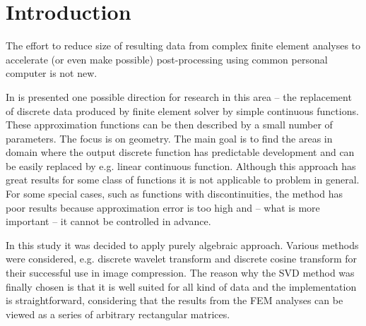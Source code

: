 \section{Introduction}
\label{sec:introduction}


The effort to reduce size of resulting data from complex finite element analyses to accelerate (or even make possible) post-processing using common personal computer is not new.


In \cite{Benes2016} is presented one possible direction for research in this area -- the replacement of discrete data produced by finite element solver by simple continuous functions. These approximation functions can be then described by a small number of parameters. The focus is on geometry. The main goal is to find the areas in domain where the output discrete function has predictable development and can be easily replaced by e.g. linear continuous function. Although this approach has great results for some class of functions it is not applicable to problem in general. For some special cases, such as functions with discontinuities, the method has poor results because approximation error is too high and -- what is more important -- it cannot be controlled in advance.

In this study it was decided to apply purely algebraic approach. Various methods were considered, e.g. discrete wavelet transform \cite{Lui2001} and discrete cosine transform \cite{Watson1994} for their successful use in image compression. The reason why the SVD method was finally chosen is that it is well suited for all kind of data and the implementation is straightforward, considering that the results from the FEM analyses can be viewed as a series of arbitrary rectangular matrices.


